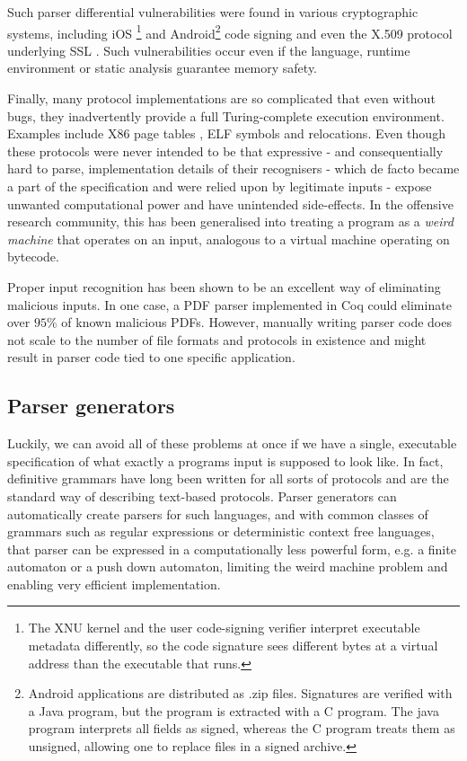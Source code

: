 Such parser differential vulnerabilities were found in various cryptographic systems, including  iOS
\footnote{The XNU kernel and the user code-signing verifier interpret executable metadata
  differently, so the code signature sees different bytes at a virtual address than the executable
  that runs.}\cite{evaders6} and Android\footnote{Android applications are distributed as .zip
  files. Signatures are verified with a Java program, but the program is extracted with a C program.
The java program interprets all fields as signed, whereas the C program treats them as unsigned,
allowing one to replace files in a signed archive.}
\cite{saurik-masterkey} code signing and even the
X.509 protocol underlying SSL \cite{DBLP:conf/fc/KaminskyPS10}. Such vulnerabilities occur even if the language,
runtime environment or static analysis guarantee memory safety.

Finally, many protocol implementations are so complicated that even without bugs, they inadvertently
provide a full Turing-complete execution environment. Examples include X86 page tables
\cite{bangert2013page}, ELF symbols and relocations\cite{shapiro2013weird}. Even though these
protocols were never intended to be that expressive - and consequentially hard to parse, implementation details of their
recognisers - which de facto became a part of the specification and were relied upon by legitimate
inputs - expose unwanted computational power and have unintended side-effects.
In the offensive research community, this has
been generalised into treating a program as a \textit{weird machine}\cite{bratus2011exploit} that
operates on an input, analogous to a virtual machine operating on bytecode.

Proper input recognition has been shown to be an excellent way of eliminating malicious inputs. In
one case, a  PDF parser implemented in Coq could eliminate over $95\%$ of known malicious PDFs\cite{Bogk-PDF}.
However, manually writing parser code does not scale to the number of file formats  and protocols in
existence and might result in parser code tied to one specific application.


\subsection{Parser generators}
Luckily, we can avoid all of these problems at once if we have a single, executable specification of
what exactly a programs input is supposed to look like. In fact, definitive grammars have long
been written for all sorts of protocols and are the standard way of describing text-based protocols.
Parser generators can automatically create parsers for such languages, and with common classes of
grammars such as regular expressions or deterministic context free languages, that parser can be
expressed in a computationally less powerful form, e.g. a finite automaton or a push down automaton,
limiting the weird machine problem and enabling very efficient implementation. \cite{Knuth1965607}


